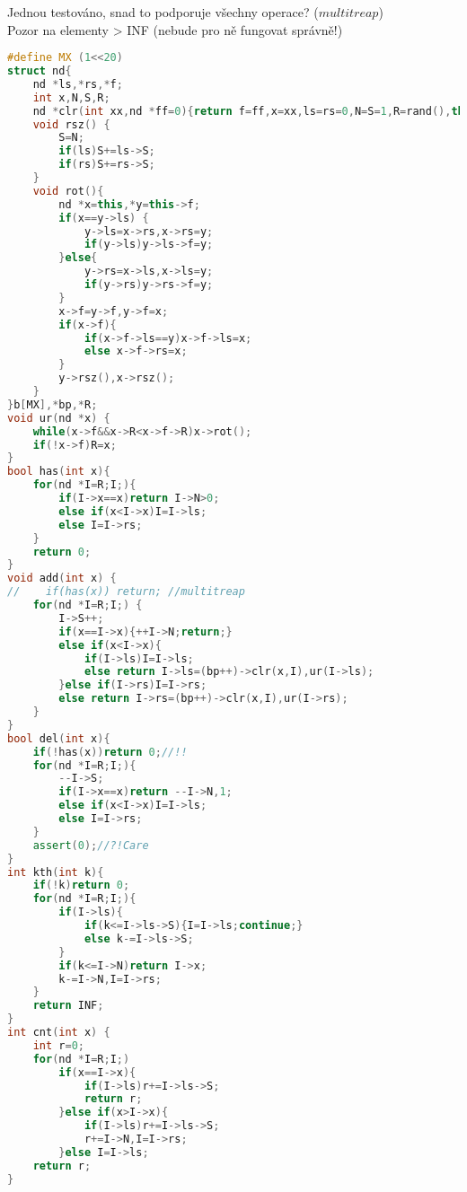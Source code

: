 \documentclass[11pt]{article}
\begin{document}
Jednou testováno, snad to podporuje všechny operace? ($multitreap$)
\\Pozor na elementy > INF (nebude pro ně fungovat správně!)
\begin{lstlisting}[language=C++]
#define MX (1<<20)
struct nd{
    nd *ls,*rs,*f;
    int x,N,S,R;
    nd *clr(int xx,nd *ff=0){return f=ff,x=xx,ls=rs=0,N=S=1,R=rand(),this;}
    void rsz() {
        S=N;
        if(ls)S+=ls->S;
        if(rs)S+=rs->S;
    }
    void rot(){
        nd *x=this,*y=this->f;
        if(x==y->ls) {
            y->ls=x->rs,x->rs=y;
            if(y->ls)y->ls->f=y;
        }else{
            y->rs=x->ls,x->ls=y;
            if(y->rs)y->rs->f=y;
        }
        x->f=y->f,y->f=x;
        if(x->f){
            if(x->f->ls==y)x->f->ls=x;
            else x->f->rs=x;
        }
        y->rsz(),x->rsz();
    }
}b[MX],*bp,*R;
void ur(nd *x) {
    while(x->f&&x->R<x->f->R)x->rot();
    if(!x->f)R=x;
}
bool has(int x){
    for(nd *I=R;I;){
        if(I->x==x)return I->N>0;
        else if(x<I->x)I=I->ls;
        else I=I->rs;
    }
    return 0;
}
void add(int x) {
//    if(has(x)) return; //multitreap
    for(nd *I=R;I;) {
        I->S++;
        if(x==I->x){++I->N;return;}
        else if(x<I->x){
            if(I->ls)I=I->ls;
            else return I->ls=(bp++)->clr(x,I),ur(I->ls);
        }else if(I->rs)I=I->rs;
        else return I->rs=(bp++)->clr(x,I),ur(I->rs);
    }
}
bool del(int x){
    if(!has(x))return 0;//!!
    for(nd *I=R;I;){
        --I->S;
        if(I->x==x)return --I->N,1;
        else if(x<I->x)I=I->ls;
        else I=I->rs;
    }
    assert(0);//?!Care
}
int kth(int k){
    if(!k)return 0;
    for(nd *I=R;I;){
        if(I->ls){
            if(k<=I->ls->S){I=I->ls;continue;}
            else k-=I->ls->S;
        }
        if(k<=I->N)return I->x;
        k-=I->N,I=I->rs;
    }
    return INF;
}
int cnt(int x) {
    int r=0;
    for(nd *I=R;I;)
        if(x==I->x){
            if(I->ls)r+=I->ls->S;
            return r;
        }else if(x>I->x){
            if(I->ls)r+=I->ls->S;
            r+=I->N,I=I->rs;
        }else I=I->ls;
    return r;
}
\end{lstlisting}
\end{document}
